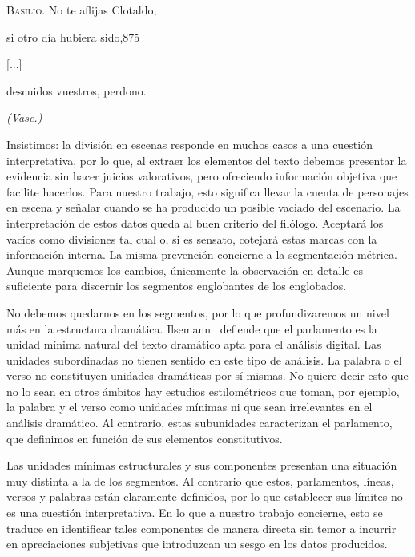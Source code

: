 \begin{exe}
	\ex\label{ex:vase}\textsc{Basilio.}\hspace{2.2cm} No te aflijas Clotaldo,\\
	\strut\hspace{3cm}si otro día hubiera sido,\hspace{3cm}875\\
	\strut\hspace{3cm}[...]\\
	\strut\hspace{3cm}descuidos vuestros, perdono.\\
	\strut\hspace{5.2cm}\textit{(Vase.)}
\end{exe}

Insistimos: la división en escenas responde en muchos casos a una cuestión interpretativa, por lo que, al extraer los elementos del texto debemos presentar la evidencia sin hacer juicios valorativos, pero ofreciendo información objetiva que facilite hacerlos. Para nuestro trabajo, esto significa llevar la cuenta de personajes en escena y señalar cuando se ha producido un posible vaciado del escenario. La interpretación de estos datos queda al buen criterio del filólogo. Aceptará los vacíos como divisiones tal cual o, si es sensato, cotejará estas marcas con la información interna. La misma prevención concierne a la segmentación métrica. Aunque marquemos los cambios, únicamente la observación en detalle es suficiente para discernir los segmentos englobantes de los englobados.

No debemos quedarnos en los segmentos, por lo que profundizaremos un nivel más en la estructura dramática.  Ilsemann~\parencite*[11]{ilsemann1998} defiende que el parlamento es la unidad mínima natural del texto dramático apta para el análisis digital. Las unidades subordinadas no tienen sentido en este tipo de análisis. La palabra o el verso no constituyen unidades dramáticas por sí mismas. No quiere decir esto que no lo sean en otros ámbitos \textemdash hay estudios estilométricos que toman, por ejemplo, la palabra y el verso como unidades mínimas \parencite{kroll2022a}\textemdash{} ni que sean irrelevantes en el análisis dramático. Al contrario, estas subunidades caracterizan el parlamento, que definimos en función de sus elementos constitutivos.

Las unidades mínimas estructurales y sus componentes presentan una situación muy distinta a la de los segmentos. Al contrario que estos, parlamentos, líneas, versos y palabras están claramente definidos, por lo que establecer sus límites no es una cuestión interpretativa. En lo que a nuestro trabajo concierne, esto se traduce en identificar tales componentes de manera directa sin temor a incurrir en apreciaciones subjetivas que introduzcan un sesgo en los datos producidos.

